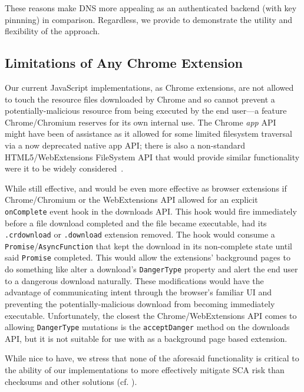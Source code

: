 These reasons make DNS more appealing as an authenticated backend (with key
pinnning) in comparison. Regardless, we provide \DHTSYS{} to demonstrate the
utility and flexibility of the \SYSTEM{} approach.

\subsection{Limitations of Any Chrome Extension}

Our current JavaScript implementations, as Chrome extensions, are not allowed to
touch the resource files downloaded by Chrome and so cannot prevent a
potentially-malicious resource from being executed by the end user---a feature
Chrome/Chromium reserves for its own internal use. The Chrome \textit{app}
API~\cite{AppAPI} might have been of assistance as it allowed for some limited
filesystem traversal via a now deprecated native app API; there is also a
non-standard HTML5/WebExtensions FileSystem API that would provide similar
functionality were it to be widely considered~\cite{deadSpec}.

While still effective, \DNSSYS{} and \DHTSYS{} would be even more effective as
browser extensions if Chrome/Chromium or the WebExtensions API allowed for an
explicit \texttt{onComplete} event hook in the downloads API. This hook would
fire immediately before a file download completed and the file became
executable, \ie had its \texttt{.crdownload} or \texttt{.download} extension
removed. The hook would consume a \texttt{Promise}/\texttt{AsyncFunction} that
kept the download in its non-complete state until said \texttt{Promise}
completed. This would allow the extensions' background pages to do something
like alter a download's \texttt{DangerType} property and alert the end user to a
dangerous download naturally. These modifications would have the advantage of
communicating intent through the browser's familiar UI and preventing the
potentially-malicious download from becoming immediately executable.
Unfortunately, the closest the Chrome/WebExtensions API comes to allowing
\texttt{DangerType} mutations is the \texttt{acceptDanger} method on the
downloads API, but it is not suitable for use with \DNSSYS{} as a background
page based extension.

While nice to have, we stress that none of the aforesaid functionality is
critical to the ability of our implementations to more effectively mitigate SCA
risk than checksums and other solutions (cf. ).
